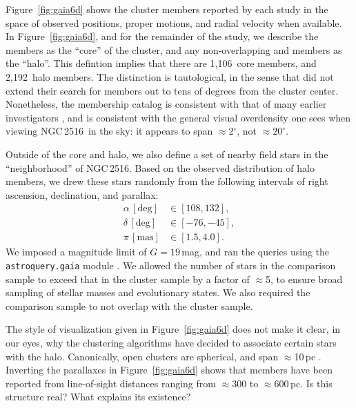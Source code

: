 \documentclass[12pt,twocolumn,tighten]{aastex63}
\newcommand{\cn}{NGC\,2516} %
\newcommand{\ncore}{1{,}106}  %
\newcommand{\nhalo}{2{,}192} %
\begin{document}
Figure~\ref{fig:gaia6d} shows the cluster members reported by each
study in the space of observed positions, proper motions, and radial
velocity when available.
In Figure~\ref{fig:gaia6d}, and for the remainder of the study, we
describe the  members as the
``core'' of the cluster, and any non-overlapping
 and 
members as the ``halo''.  This defintion implies that there are
\ncore\ core members, and \nhalo\ halo members.  The distinction is
tautological, in the sense that  did
not extend their search for members out to tens of degrees from the
cluster center.  Nonetheless, the 
membership catalog is consistent with that of many earlier
investigators \citep[{\it
e.g.},][]{jeffries_ngc2516_2001,Kharchenko_et_al_2013}, and is
consistent with the general visual overdensity one sees when viewing
\cn\ in the sky: it appears to span $\approx$2$^\circ$, not
$\approx20^\circ$.

Outside of the core and halo, we also define a set of nearby field
stars in the ``neighborhood'' of \cn.  Based on the observed
distribution of halo members, we drew these stars randomly from the
following intervals of right ascension, declination, and parallax:
\begin{align}
  \alpha\,[\mathrm{deg}] &\in [108, 132], \\
  \delta\,[\mathrm{deg}] &\in [-76, -45], \\
  \pi\,[\mathrm{mas}] &\in [1.5, 4.0].
\end{align}
We imposed a magnitude limit of $G=19$\,mag, and ran the queries using
the \texttt{astroquery.gaia} module \citep{astroquery_2018}.  We
allowed the number of stars in the comparison sample to exceed that in
the cluster sample by a factor of $\approx$5, to ensure broad sampling
of stellar masses and evolutionary states.  We also required the
comparison sample to not overlap with the cluster sample.

The style of visualization given in Figure~\ref{fig:gaia6d} does not
make it clear, in our eyes, why the clustering algorithms have decided
to associate certain stars with the halo.  Canonically, open clusters
are spherical, and span $\approx$10\,pc \citep[{\it
e.g.},][]{Kharchenko_et_al_2013}.  Inverting the parallaxes in
Figure~\ref{fig:gaia6d} shows that members have been reported from
line-of-sight distances ranging from $\approx$$300$ to
$\approx$$600\,$pc.  Is this structure real? What explains its
existence?
\end{document}
